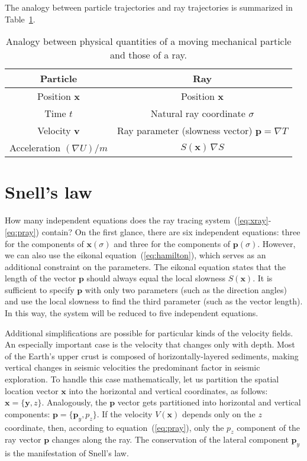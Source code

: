 The analogy between particle trajectories and ray trajectories is
summarized in Table~\ref{tab:anal}. 

\begin{table}
  \centering
  \begin{tabular}{|c||c|} \hline
    Particle & Ray \\ \hline \hline
    Position $\mathbf{x}$ & Position $\mathbf{x}$ \\ \hline
    Time $t$ & Natural ray coordinate $\sigma$ \\ \hline
    Velocity $\mathbf{v}$ & Ray parameter (slowness vector) $\mathbf{p} = \nabla T$  \\ \hline
    Acceleration 
    $(\nabla U)/m$ & $S(\mathbf{x})\,\nabla S$ \\ \hline
  \end{tabular}
\caption{Analogy between physical quantities of a moving mechanical
  particle and those of a ray.}
\label{tab:anal}
\end{table}

\section{Snell's law}
How many independent equations does the ray tracing
system~(\ref{eq:xray}-\ref{eq:pray}) contain? On the first glance,
there are six independent equations: three for the components of
$\mathbf{x}(\sigma)$ and three for the components of
$\mathbf{p}(\sigma)$. However, we can also use the eikonal
equation~(\ref{eq:hamilton}), which serves as an additional constraint
on the parameters. The eikonal equation states that the length of the
vector $\mathbf{p}$ should always equal the local slowness
$S(\mathbf{x})$. It is sufficient to specify $\mathbf{p}$ with only
two parameters (such as the direction angles) and use the local
slowness to find the third parameter (such as the vector length). In
this way, the system will be reduced to five independent equations.

Additional simplifications are possible for particular kinds of the
velocity fields. An especially important case is the velocity that
changes only with depth. Most of the Earth's upper crust is composed
of horizontally-layered sediments, making vertical changes in seismic
velocities the predominant factor in seismic exploration. To handle
this case mathematically, let us partition the spatial location vector
$\mathbf{x}$ into the horizontal and vertical coordinates, as follows:
$\mathbf{x}=\{\mathbf{y},z\}$. Analogously, the $\mathbf{p}$ vector
gets partitioned into horizontal and vertical components: 
$\mathbf{p}=\{\mathbf{p}_y,p_z\}$. If the velocity $V(\mathbf{x})$
depends only on the $z$ coordinate, then, according to
equation~(\ref{eq:pray}), only the $p_z$ component of the ray vector
$\mathbf{p}$ changes along the ray. The conservation of the lateral
component $\mathbf{p}_y$ is the manifestation of Snell's law.

